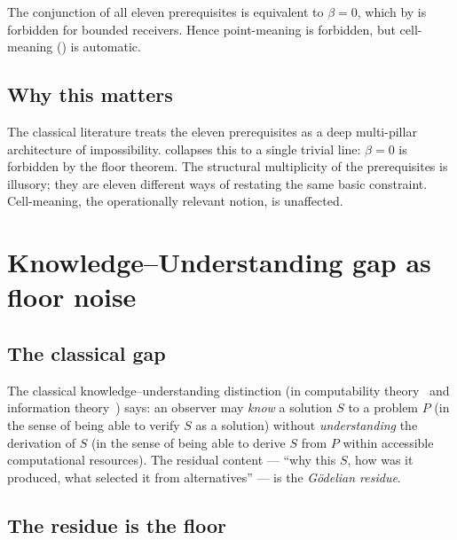 \documentclass[11pt,a4paper]{article}
\begin{document}
\begin{corollary}\label{cor:master}
The conjunction of all eleven prerequisites is equivalent to
$\beta=0$, which by  is forbidden for bounded
receivers. Hence point-meaning is forbidden, but cell-meaning
() is automatic.
\end{corollary}

\subsection{Why this matters}

\begin{remark}\label{rem:rhetoric}
The classical literature treats the eleven prerequisites as a deep
multi-pillar architecture of impossibility. 
collapses this to a single trivial line: $\beta=0$ is forbidden by
the floor theorem. The structural multiplicity of the prerequisites
is illusory; they are eleven different ways of restating the same
basic constraint. Cell-meaning, the operationally relevant notion,
is unaffected.
\end{remark}

\section{Knowledge--Understanding gap as floor noise}
\label{sec:godel}

\subsection{The classical gap}

The classical knowledge--understanding distinction (in computability
theory~\cite{turing1936,godel1931} and information
theory~\cite{chaitin1974}) says: an observer may \emph{know} a
solution $S$ to a problem $P$ (in the sense of being able to verify
$S$ as a solution) without \emph{understanding} the derivation of $S$
(in the sense of being able to derive $S$ from $P$ within accessible
computational resources). The residual content --- ``why this $S$,
how was it produced, what selected it from alternatives'' --- is the
\emph{Gödelian residue}.

\subsection{The residue is the floor}
\end{document}
